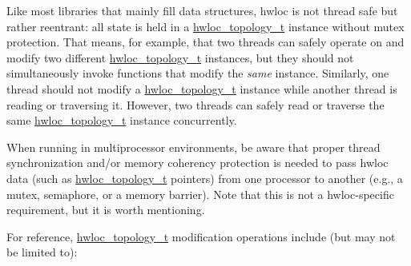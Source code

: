 Like most libraries that mainly fill data structures, hwloc is not thread safe but rather reentrant: all state is held in a \hyperlink{a00039_ga9d1e76ee15a7dee158b786c30b6a6e38}{hwloc\_\-topology\_\-t} instance without mutex protection. That means, for example, that two threads can safely operate on and modify two different \hyperlink{a00039_ga9d1e76ee15a7dee158b786c30b6a6e38}{hwloc\_\-topology\_\-t} instances, but they should not simultaneously invoke functions that modify the {\itshape same\/} instance. Similarly, one thread should not modify a \hyperlink{a00039_ga9d1e76ee15a7dee158b786c30b6a6e38}{hwloc\_\-topology\_\-t} instance while another thread is reading or traversing it. However, two threads can safely read or traverse the same \hyperlink{a00039_ga9d1e76ee15a7dee158b786c30b6a6e38}{hwloc\_\-topology\_\-t} instance concurrently.

When running in multiprocessor environments, be aware that proper thread synchronization and/or memory coherency protection is needed to pass hwloc data (such as \hyperlink{a00039_ga9d1e76ee15a7dee158b786c30b6a6e38}{hwloc\_\-topology\_\-t} pointers) from one processor to another (e.g., a mutex, semaphore, or a memory barrier). Note that this is not a hwloc-\/specific requirement, but it is worth mentioning.

For reference, \hyperlink{a00039_ga9d1e76ee15a7dee158b786c30b6a6e38}{hwloc\_\-topology\_\-t} modification operations include (but may not be limited to):


